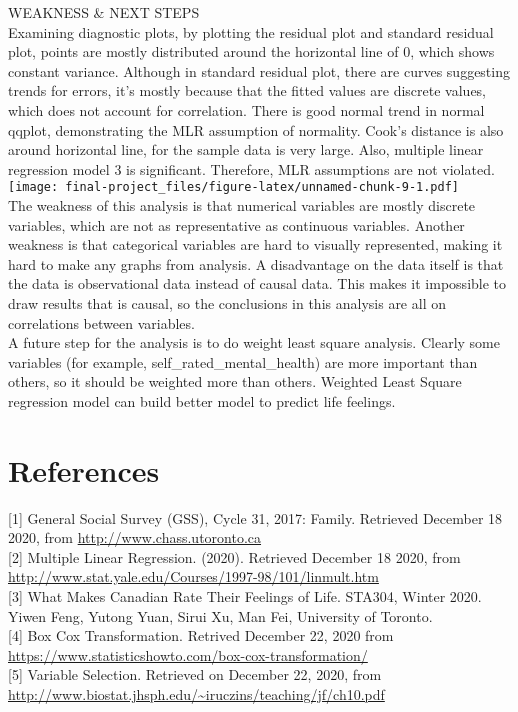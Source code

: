 \documentclass[
]{article}
\begin{document}
WEAKNESS \& NEXT STEPS\\
Examining diagnostic plots, by plotting the residual plot and standard
residual plot, points are mostly distributed around the horizontal line
of 0, which shows constant variance. Although in standard residual plot,
there are curves suggesting trends for errors, it's mostly because that
the fitted values are discrete values, which does not account for
correlation. There is good normal trend in normal qqplot, demonstrating
the MLR assumption of normality. Cook's distance is also around
horizontal line, for the sample data is very large. Also, multiple
linear regression model 3 is significant. Therefore, MLR assumptions are
not violated.\\
\texttt{[image: final-project\_files/figure-latex/unnamed-chunk-9-1.pdf]}\\
The weakness of this analysis is that numerical variables are mostly
discrete variables, which are not as representative as continuous
variables. Another weakness is that categorical variables are hard to
visually represented, making it hard to make any graphs from analysis. A
disadvantage on the data itself is that the data is observational data
instead of causal data. This makes it impossible to draw results that is
causal, so the conclusions in this analysis are all on correlations
between variables.\\
A future step for the analysis is to do weight least square analysis.
Clearly some variables (for example, self\_rated\_mental\_health) are
more important than others, so it should be weighted more than others.
Weighted Least Square regression model can build better model to predict
life feelings.\\

\hypertarget{references}{%
\section{References}\label{references}}

{[}1{]} General Social Survey (GSS), Cycle 31, 2017: Family. Retrieved
December 18 2020, from \url{http://www.chass.utoronto.ca}\\
{[}2{]} Multiple Linear Regression. (2020). Retrieved December 18 2020,
from \url{http://www.stat.yale.edu/Courses/1997-98/101/linmult.htm}\\
{[}3{]} What Makes Canadian Rate Their Feelings of Life. STA304, Winter
2020. Yiwen Feng, Yutong Yuan, Sirui Xu, Man Fei, University of
Toronto.\\
{[}4{]} Box Cox Transformation. Retrived December 22, 2020 from
\url{https://www.statisticshowto.com/box-cox-transformation/}\\
{[}5{]} Variable Selection. Retrieved on December 22, 2020, from
\url{http://www.biostat.jhsph.edu/~iruczins/teaching/jf/ch10.pdf}
\end{document}
